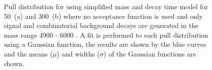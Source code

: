 \begin{figure}[tbp]
\begin{subfigure}[b]{0.48\textwidth}
   \end{subfigure}
    \caption{Pull distribution for \tmumu using simplified mass and decay time model for 50~\fb (a) and 300~\fb (b) where no acceptance function is used and only signal and combinatorial background decays are generated in the mass range 4900 - 6000 \mevcc. A fit is performed to each pull distribution using a Gaussian function, the results are shown by the blue curves and the means ($\mu$) and widths ($\sigma$) of the Gaussian functions are shown.}
    \label{fig:morestatstaupulls}
\end{figure}

\clearpage 

